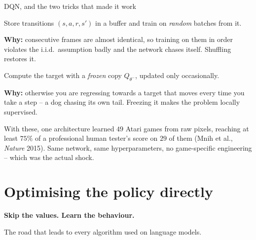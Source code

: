 \documentclass[aspectratio=169]{beamer}
\begin{document}
\begin{frame}{DQN, and the two tricks that made it work}
  \begin{tcolorbox}[colback=armblue!8, colframe=armblue, boxrule=0.6pt, arc=2pt,
                    title=\textbf{Experience replay}]
    \small
    Store transitions $(s,a,r,s')$ in a buffer and train on \emph{random} batches from it.

    \vskip 3pt
    \textbf{Why:} consecutive frames are almost identical, so training on them in order
    violates the i.i.d.\ assumption badly and the network chases itself. Shuffling restores it.
  \end{tcolorbox}

  \vskip 6pt
  \begin{tcolorbox}[colback=paramgreen!8, colframe=paramgreen, boxrule=0.6pt, arc=2pt,
                    title=\textbf{Target network}]
    \small
    Compute the target with a \emph{frozen} copy $Q_{\theta^-}$, updated only occasionally.

    \vskip 3pt
    \textbf{Why:} otherwise you are regressing towards a target that moves every time you take
    a step -- a dog chasing its own tail. Freezing it makes the problem locally supervised.
  \end{tcolorbox}

  \vskip 8pt
  \small
  With these, one architecture learned $49$ Atari games from raw pixels, reaching at least
  $75\%$ of a professional human tester's score on $29$ of them (Mnih et al., \emph{Nature}
  2015). Same network, same hyperparameters, no game-specific engineering -- which was the
  actual shock.
\end{frame}

\section{Optimising the policy directly}
\begin{frame}[plain]
  \begin{center}
    \vskip 1.6cm
    {\Huge\bfseries\color{popblue}Skip the values. Learn the behaviour.}

    \vskip 0.6cm
    {\large The road that leads to every algorithm used on language models.}
  \end{center}
\end{frame}
\end{document}
